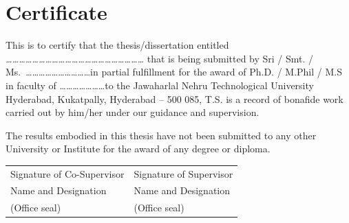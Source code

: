 \chapter*{Certificate}
\thispagestyle{plain}

This is to certify that the thesis/dissertation entitled
\textit{\ldots\ldots\ldots\ldots\ldots\ldots\ldots\ldots\ldots\ldots\ldots\ldots\ldots\ldots\ldots\ldots\ldots\ldots\ldots\ldots\ldots}
that is being submitted by Sri / Smt. / Ms.\
\ldots\ldots\ldots\ldots\ldots\ldots\ldots\ldots\ldots\ldots in partial
fulfillment for the award of Ph.D. / M.Phil / M.S in faculty of
\ldots\ldots\ldots\ldots\ldots\ldots\ldots to the Jawaharlal Nehru
Technological University Hyderabad, Kukatpally, Hyderabad -- 500 085,
T.S. is a record of bonafide work carried out by him/her under our
guidance and supervision.

The results embodied in this thesis have not been submitted to any
other University or Institute for the award of any degree or diploma.
\vspace{2.5cm}

\noindent
\begin{tabular}{p{6cm} p{6cm}}
    Signature of Co-Supervisor & Signature of Supervisor \\[2cm]
    Name and Designation        & Name and Designation \\[0.5cm]
    (Office seal)               & (Office seal)
\end{tabular}

\newpage
